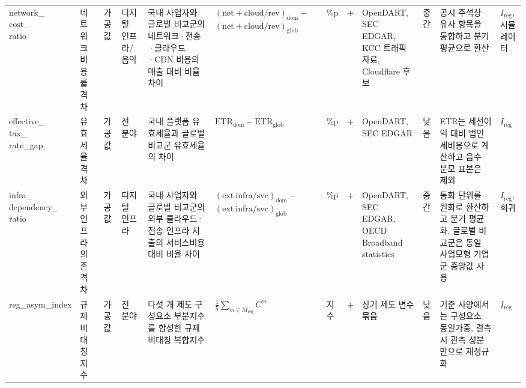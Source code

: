 \documentclass[11pt,a4paper]{report}
\newcommand{\WrapCell}[1]{\parbox[t]{\hsize}{\RaggedRight #1}}
\begin{document}
\begin{landscape}
\begin{longtable}{@{}L{2.0cm}L{1.8cm}L{0.8cm}L{1.6cm}L{2.6cm}L{4.1cm}L{1.0cm}L{0.8cm}L{2.6cm}L{1.1cm}L{2.5cm}L{1.7cm}@{}}
\WrapCell{network\_\\cost\_\\ratio} & 네트워크비용률 격차 & 가공값 & 디지털 인프라/음악 & 국내 사업자와 글로벌 비교군의 네트워크·전송·클라우드·CDN 비용의 매출 대비 비율 차이 & \WrapCell{$(\mathrm{net+cloud}/\mathrm{rev})_{\mathrm{dom}}-$\\$(\mathrm{net+cloud}/\mathrm{rev})_{\mathrm{glob}}$} & \%p & + & \WrapCell{OpenDART, SEC EDGAR,\\KCC 트래픽 자료,\\Cloudflare 후보} & 중간 & 공시 주석상 유사 항목을 통합하고 분기 평균으로 환산 & $I_{\mathrm{reg}}$, 시뮬레이터 \\
\WrapCell{effective\_\\tax\_\\rate\_gap} & 유효세율 격차 & 가공값 & 전 분야 & 국내 플랫폼 유효세율과 글로벌 비교군 유효세율의 차이 & $\mathrm{ETR}_{\mathrm{dom}}-\mathrm{ETR}_{\mathrm{glob}}$ & \%p & + & OpenDART, SEC EDGAR & 낮음 & ETR는 세전이익 대비 법인세비용으로 계산하고 음수 분모 표본은 제외 & $I_{\mathrm{reg}}$ \\
\WrapCell{infra\_\\dependency\_\\ratio} & 외부인프라 의존 격차 & 가공값 & 디지털 인프라 & 국내 사업자와 글로벌 비교군의 외부 클라우드·전송 인프라 지출의 서비스비용 대비 비율 차이 & \WrapCell{$(\mathrm{ext\ infra}/\mathrm{svc})_{\mathrm{dom}}-$\\$(\mathrm{ext\ infra}/\mathrm{svc})_{\mathrm{glob}}$} & \%p & + & \WrapCell{OpenDART, SEC EDGAR,\\OECD Broadband statistics} & 중간 & 통화 단위를 원화로 환산하고 분기 평균화, 글로벌 비교군은 동일 사업모형 기업군 중앙값 사용 & $I_{\mathrm{reg}}$, 회귀 \\
reg\_asym\_index & 규제비대칭지수 & 가공값 & 전 분야 & 다섯 개 제도 구성요소 부분지수를 합성한 규제 비대칭 복합지수 & $\frac{1}{5}\sum_{m \in M_{\mathrm{reg}}} C^m$ & 지수 & + & 상기 제도 변수 묶음 & 낮음 & 기준 사양에서는 구성요소 동일가중, 결측 시 관측 성분만으로 재정규화 & $I_{\mathrm{reg}}$ \\
\bottomrule
\end{longtable}
\normalsize
\end{landscape}
\end{document}
